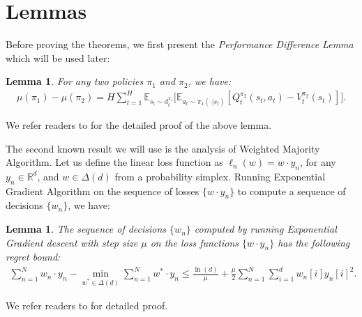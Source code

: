 \documentclass{article}
\newtheorem{lemma}[theorem]{Lemma}
\begin{document}
\section{Lemmas}
Before proving the theorems, we first present the \emph{Performance Difference Lemma} \cite{kakade2002approximately,ross2014reinforcement} which will be used later:
\begin{lemma}
\label{lemma:performance_difference}
For any two policies $\pi_1$ and $\pi_2$, we have:
\begin{align}
\mu(\pi_1) - \mu(\pi_2) = H\sum_{t=1}^H \mathbb{E}_{s_t\sim d_t^{\pi_1}}\big[\mathbb{E}_{a_t\sim \pi_1(\cdot|s_t)}[Q_t^{\pi_2}(s_t,a_t) - V_t^{\pi_2}(s_t)]\big].
\end{align}
\end{lemma} We refer readers to \cite{ross2014reinforcement} for the detailed proof of the above lemma. 

The second known result we will use is the analysis of Weighted Majority Algorithm. Let us define the linear loss function as $\ell_n(w) = w\cdot y_n$, for any $y_n\in\mathbb{R}^d$, and $w\in\Delta(d)$ from a probability simplex. Running Exponential Gradient Algorithm on the sequence of losses $\{w\cdot y_n\}$ to compute a sequence of decisions $\{w_n\}$, we have:
\begin{lemma} 
\label{lemma:EG}
The sequence of decisions $\{w_n\}$ computed by running Exponential Gradient descent with step size $\mu$ on the loss functions $\{w\cdot y_n\}$ has the following regret bound:
\begin{align}
\sum_{n=1}^N w_n\cdot y_n - \min_{w^*\in\Delta(d)} \sum_{n=1}^N w^*\cdot y_n \leq \frac{\ln(d)}{\mu} + \frac{\mu}{2}\sum_{n=1}^N\sum_{i=1}^d w_n[i] y_n[i]^2.
\end{align}
\end{lemma} We refer readers to \cite{shalev2012online} for detailed proof.
\end{document}
